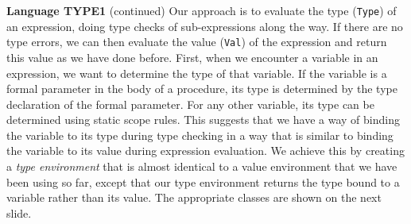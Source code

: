 \begin{minipage}[t]{\sw}
\slidenumber
\LARGE
{\bf Language TYPE1} (continued)\exx
Our approach is to evaluate the type (\verb'Type') of an expression,
doing type checks of sub-expressions along the way.
If there are no type errors,
we can then evaluate the value (\verb'Val') of the expression
and return this value as we have done before.\exx
First, when we encounter a variable in an expression,
we want to determine the type of that variable.
If the variable is a formal parameter in the body of a procedure,
its type is determined by the type declaration of the formal parameter.
For any other variable,
its type can be determined using static scope rules.
This suggests that we have a way of binding the variable to its type
during type checking
in a way that is similar to binding the variable to its value
during expression evaluation.
We achieve this by creating a {\em type environment}
that is almost identical to a value environment
that we have been using so far,
except that our type environment returns
the type bound to a variable rather than its value.\exx
The appropriate classes are shown on the next slide.
\end{minipage}
